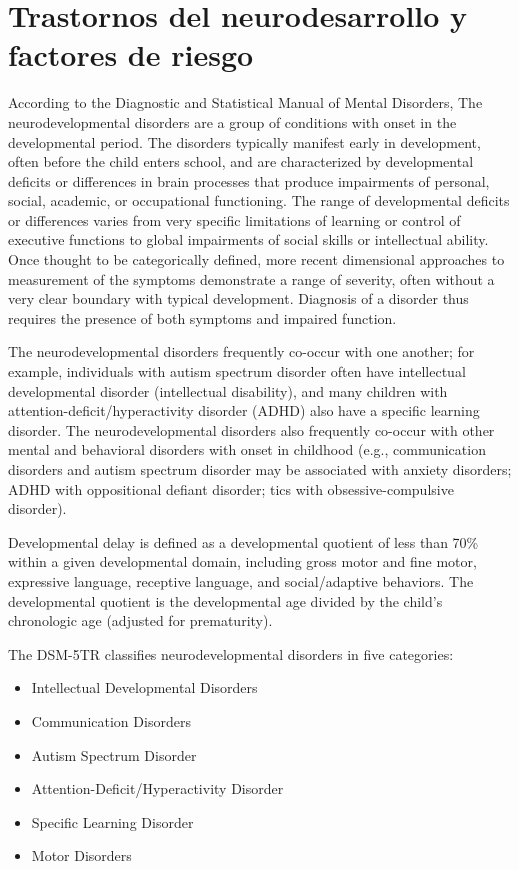 \section{Trastornos del neurodesarrollo y factores de riesgo}
According to the Diagnostic and Statistical Manual of Mental Disorders, \cite{DSM5TR}
The neurodevelopmental disorders are a group of conditions with onset in the developmental period. The disorders typically manifest early in development, often before the child enters school, and are characterized by developmental deficits or differences in brain processes that produce impairments of personal, social, academic, or occupational functioning. The range of developmental deficits or differences varies from very specific limitations of learning or control of executive functions to global impairments of social skills or intellectual ability. Once thought to be categorically defined, more recent dimensional approaches to measurement of the symptoms demonstrate a range of severity, often without a very clear boundary with typical development. Diagnosis of a disorder thus requires the presence of both symptoms and impaired function.

The neurodevelopmental disorders frequently co-occur with one another; for example, individuals with autism spectrum disorder often have intellectual developmental disorder (intellectual disability), and many children with attention-deficit/hyperactivity disorder (ADHD) also have a specific learning disorder. The neurodevelopmental disorders also frequently co-occur with other mental and behavioral disorders with onset in childhood (e.g., communication disorders and autism spectrum disorder may be associated with anxiety disorders; ADHD with oppositional defiant disorder; tics with obsessive-compulsive disorder).
\cite{DSM5TR}

Developmental delay is defined as a developmental quotient of less than 70\%
within a given developmental domain, including gross motor and fine motor,
expressive language, receptive language, and social/adaptive behaviors. The
developmental quotient is the developmental age divided by the child’s
chronologic age (adjusted for prematurity). \cite{vanKarnebeek2018}

The DSM-5TR classifies neurodevelopmental disorders in five categories:
	\begin{itemize}
		\item Intellectual Developmental Disorders
		\item Communication Disorders
		\item Autism Spectrum Disorder
		\item Attention-Deficit/Hyperactivity Disorder
		\item Specific Learning Disorder
		\item Motor Disorders
	\end{itemize}

